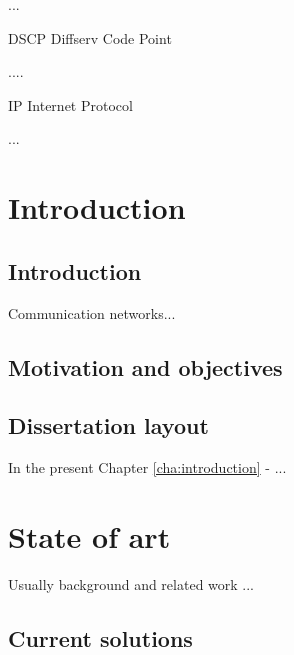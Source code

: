 \documentclass[12pt,english]{book}
\newenvironment{lyxlist}[1]
   {\begin{list}{}
     {\settowidth{\labelwidth}{#1}
      \setlength{\leftmargin}{\labelwidth}
      \addtolength{\leftmargin}{\labelsep}
      \renewcommand{\makelabel}[1]{##1\hfil}}}
   {\end{list}}
\begin{document}
\begin{lyxlist}{00.00.0000}
\begin{singlespace}
\item ...
\item [DSCP]Diffserv Code Point 
\item ....
\item [IP]Internet Protocol 
\item ...
\end{singlespace}
\end{lyxlist}

\cleardoublepage

\listoffigures

\cleardoublepage

\listoftables

\cleardoublepage

\setcounter{page}{0}



\chapter{Introduction\label{cha:introduction}}

\section{Introduction}
Communication networks...

\section{Motivation and objectives\label{sec:motobj}}

\section{Dissertation layout}

In the present Chapter \ref{cha:introduction} - ...

\chapter{State of art \label{cha:stateofart} }

Usually background and related work ...

\section{Current solutions}
\end{document}
